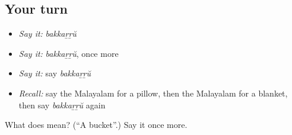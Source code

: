 \subsection*{Your turn}
\begin{itemize}
\raggedright
  \item \emph{Say it:} \emph{bakkaṟṟŭ}
  \item \emph{Say it:} \emph{bakkaṟṟŭ}, once more
  \item \emph{Say it:} say \emph{bakkaṟṟŭ}
  \item \emph{Recall:} say the Malayalam for a pillow, then the Malayalam for a blanket, then say \emph{bakkaṟṟŭ} again
\end{itemize}

\begin{tcolorbox}[breakable,colback=teal!4,colframe=teal!35!black,title={Before you move on}]
What does  mean? (\textquotedblleft{}A bucket\textquotedblright{}.) Say it once more.
\end{tcolorbox}
